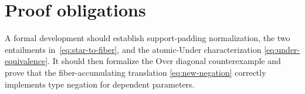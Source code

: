 \documentclass[10pt]{ctexart}
\begin{document}
\section{Proof obligations}

A formal development should establish support-padding normalization, the two
entailments in~\eqref{eq:star-to-fiber}, and the atomic-Under characterization
\eqref{eq:under-equivalence}.  It should then formalize the Over diagonal
counterexample and prove that the fiber-accumulating translation
\eqref{eq:new-negation} correctly implements type negation for dependent
parameters.
\end{document}
